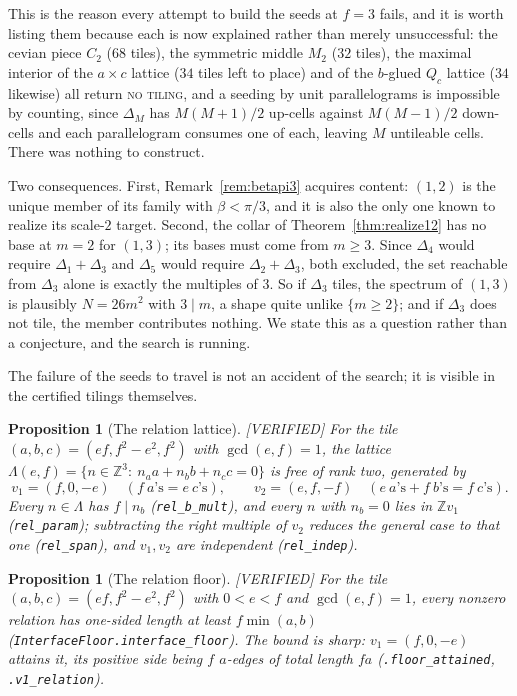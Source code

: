 \documentclass[11pt,reqno]{amsart}
\theoremstyle{plain}
\newtheorem{proposition}[theorem]{Proposition}
\theoremstyle{definition}
\newcommand{\Z}{\mathbb{Z}}
\newcommand{\lab}[1]{\hfill\textnormal{\footnotesize\textsc{[#1]}}}
\begin{document}
This is the reason every attempt to build the seeds at $f=3$ fails, and it is worth listing them
because each is now explained rather than merely unsuccessful: the cevian piece $C_2$ ($68$ tiles),
the symmetric middle $M_2$ ($32$ tiles), the maximal interior of the $a\times c$ lattice ($34$ tiles
left to place) and of the $b$-glued $Q_c$ lattice ($34$ likewise) all return \textsc{no tiling}, and
a seeding by unit parallelograms is impossible by counting, since $\Delta_M$ has $M(M{+}1)/2$
up-cells against $M(M{-}1)/2$ down-cells and each parallelogram consumes one of each, leaving $M$
untileable cells. There was nothing to construct.

Two consequences. First, Remark~\ref{rem:betapi3} acquires content: $(1,2)$ is the unique member of
its family with $\beta<\pi/3$, and it is also the only one known to realize its scale-$2$ target.
Second, the collar of Theorem~\ref{thm:realize12} has no base at $m=2$ for $(1,3)$; its bases must
come from $m\ge3$. Since $\Delta_4$ would require $\Delta_1+\Delta_3$ and $\Delta_5$ would require
$\Delta_2+\Delta_3$, both excluded, the set reachable from $\Delta_3$ alone is exactly the multiples
of $3$. So if $\Delta_3$ tiles, the spectrum of $(1,3)$ is plausibly $N=26m^2$ with $3\mid m$, a
shape quite unlike $\{m\ge2\}$; and if $\Delta_3$ does not tile, the member contributes nothing. We
state this as a question rather than a conjecture, and the search is running.

The failure of the seeds to travel is not an accident of the search; it is visible in the
certified tilings themselves.

\begin{proposition}[The relation lattice]\label{prop:rellattice}\lab{VERIFIED}
For the tile $(a,b,c)=(ef,f^2-e^2,f^2)$ with $\gcd(e,f)=1$, the lattice
$\Lambda(e,f)=\{n\in\Z^3:\ n_aa+n_bb+n_cc=0\}$ is free of rank two, generated by
\[
v_1=(f,0,-e)\quad(f\ \text{$a$'s}=e\ \text{$c$'s}),\qquad
v_2=(e,f,-f)\quad(e\ \text{$a$'s}+f\ \text{$b$'s}=f\ \text{$c$'s}).
\]
Every $n\in\Lambda$ has $f\mid n_b$ (\texttt{rel\_b\_mult}), and every $n$ with $n_b=0$ lies in
$\Z v_1$ (\texttt{rel\_param}); subtracting the right multiple of $v_2$ reduces the general case to
that one (\texttt{rel\_span}), and $v_1,v_2$ are independent (\texttt{rel\_indep}).
\end{proposition}

\begin{proposition}[The relation floor]\label{prop:relfloor}\lab{VERIFIED}
For the tile $(a,b,c)=(ef,f^2-e^2,f^2)$ with $0<e<f$ and $\gcd(e,f)=1$, every nonzero relation has
one-sided length at least $f\min(a,b)$ (\texttt{InterfaceFloor.interface\_floor}). The bound is
sharp: $v_1=(f,0,-e)$ attains it, its positive side being $f$ $a$-edges of total length $f a$
(\texttt{.floor\_attained}, \texttt{.v1\_relation}).
\end{proposition}
\end{document}
